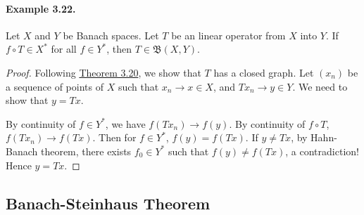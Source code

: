 \documentclass{article}
\begin{document}
\paragraph{Example 3.22.\label{example:3.22}} Let $X$ and $Y$ be Banach spaces. Let $T$ be an linear operator from $X$ into $Y$. If $f\circ T\in X^*$ for all $f\in Y^*$, then $T\in\mathfrak{B}(X,Y)$.
\begin{proof}
Following \hyperref[thm:3.20]{Theorem 3.20}, we show that $T$ has a closed graph. Let $(x_n)$ be a sequence of points of $X$ such that $x_n\to x\in X$, and $Tx_n\to y\in Y$. We need to show that $y=Tx$.

By continuity of $f\in Y^*$, we have $f(Tx_n)\to f(y)$. By continuity of $f\circ T$, $f(Tx_n)\to f(Tx)$. Then for $f\in Y^*$, $f(y)=f(Tx)$. If $y\neq Tx$, by Hahn-Banach theorem, there exists $f_0\in Y^*$ such that $f(y)\neq f(Tx)$, a contradiction! Hence $y=Tx$.
\end{proof}

\newpage
\subsection{Banach-Steinhaus Theorem}
\end{document}
